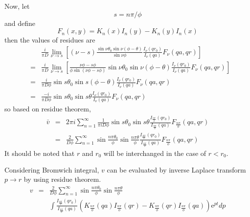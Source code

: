 \documentclass{article}
\begin{document}
Now, let
\begin{equation}
    s = n\pi / \phi
\end{equation}
and define
\begin{equation}
    F_n(x, y) = K_n(x)I_n(y) - K_n(y)I_n(x)
\end{equation}
then the values of residues are
\begin{eqnarray}
    & & \frac{i}{\pi D}\lim_{\nu\to s}\left[
        (\nu - s)\frac{\sin\nu\theta_0\sin\nu(\phi - \theta)}{\sin\nu\phi}
        \frac{I_\nu(qr_0)}{I_\nu(qa)}F_\nu(qa, qr)
        \right] \nonumber \\
    &=& \frac{i}{\pi D}\lim_{\nu\to s}\left[
        \frac{\nu\phi - s\phi}{\phi\sin(\nu\phi-s\phi)}
        \sin\nu\theta_0\sin\nu(\phi - \theta)
        \frac{I_\nu(qr_0)}{I_\nu(qa)}F_\nu(qa, qr)
        \right] \nonumber \\
    &=& \frac{i}{\pi D\phi}\sin s\theta_0\sin s(\phi - \theta)
        \frac{I_\nu(qr_0)}{I_\nu(qa)}F_\nu(qa, qr)\nonumber \\
    &=& \frac{-i}{\pi D\phi}\sin s\theta_0\sin s\theta
        \frac{I_\nu(qr_0)}{I_\nu(qa)}F_\nu(qa, qr)\nonumber
\end{eqnarray}
so based on residue theorem,
\begin{eqnarray}
    \bar{v} &=& 2\pi i\sum_{n=1}^{\infty}
                \frac{1}{\pi iD\phi}\sin s\theta_0\sin s\theta
                \frac{I_{\frac{n\pi}{\phi}}(qr_0)}{I_{\frac{n\pi}{\phi}}(qa)}
                F_{\frac{n\pi}{\phi}}(qa, qr)\nonumber \\
            &=& \frac{2}{D\phi}\sum^{\infty}_{n=1}
                \sin\frac{n\pi\theta_0}{\phi}\sin\frac{n\pi\theta}{\phi}
                \frac{I_{\frac{n\pi}{\phi}}(qr_0)}{I_{\frac{n\pi}{\phi}}(qa)}
                F_{\frac{n\pi}{\phi}}(qa, qr)\nonumber
\end{eqnarray}
It should be noted that $r$ and $r_0$ will be interchanged in the case of $r < r_0$.

Considering Bromwich integral,
$v$ can be evaluated by inverse Laplace transform $p\to r$ by using residue theorem.
\begin{eqnarray}
    v &=& \frac{2}{D\phi}\sum^{\infty}_{n=1}
          \sin\frac{n\pi\theta_0}{\phi}\sin\frac{n\pi\theta}{\phi} \nonumber \\
      & & \int\frac{I_{\frac{n\pi}{\phi}}(qr_0)}{I_{\frac{n\pi}{\phi}}(qa)}
          \left(K_{\frac{n\pi}{\phi}}(qa)I_{\frac{n\pi}{\phi}}(qr) - 
          K_{\frac{n\pi}{\phi}}(qr)I_{\frac{n\pi}{\phi}}(qa)\right)
          \mathrm{e}^{pt} dp\label{bar-v-bromwich-integral}
\end{eqnarray}
\end{document}
